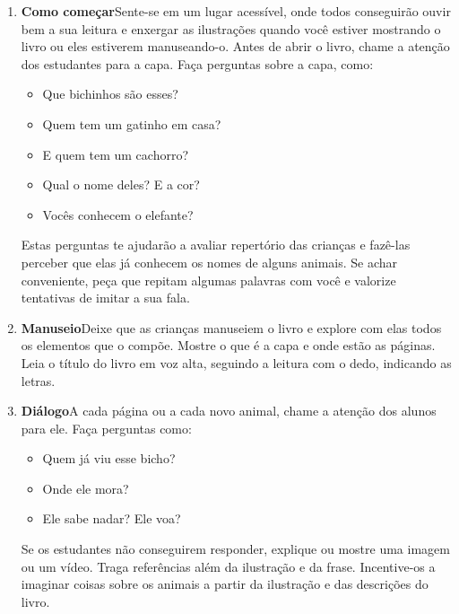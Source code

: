 \documentclass[11pt]{extarticle}
\begin{document}
\begin{enumerate}
\item \textbf{Como começar}\quad Sente-se em um lugar acessível, 
onde todos conseguirão ouvir bem a sua leitura e enxergar as ilustrações 
quando você estiver mostrando o livro ou eles estiverem manuseando-o. 
Antes de abrir o livro, chame a atenção dos estudantes para a capa. 
Faça perguntas sobre a capa, como: 

\begin{itemize}
\item Que bichinhos são esses?
\item Quem tem um gatinho em casa?
\item E quem tem um cachorro?
\item Qual o nome deles? E a cor?
\item Vocês conhecem o elefante?
\end{itemize}

Estas perguntas te ajudarão a avaliar repertório das crianças 
e fazê-las perceber que elas já conhecem os nomes de alguns animais. Se achar 
conveniente, peça que repitam algumas palavras com você e valorize tentativas 
de imitar a sua fala. 
 
\item \textbf{Manuseio}\quad Deixe que as crianças manuseiem o livro 
e explore com elas todos os elementos que o compõe. Mostre o que é a 
capa e onde estão as páginas. Leia o título do livro em voz alta, seguindo 
a leitura com o dedo, indicando as letras. 

\item \textbf{Diálogo}\quad A cada página ou a cada novo animal,
chame a atenção dos alunos para ele. Faça perguntas como:

\begin{itemize}
\item Quem já viu esse bicho?
\item Onde ele mora?
\item Ele sabe nadar? Ele voa? 
\end{itemize}

Se os estudantes não conseguirem responder, explique ou mostre uma 
imagem ou um vídeo. Traga referências além da ilustração e da frase. 
Incentive-os a imaginar coisas sobre os animais a partir da ilustração
e das descrições do livro.




\end{enumerate}
\end{document}
